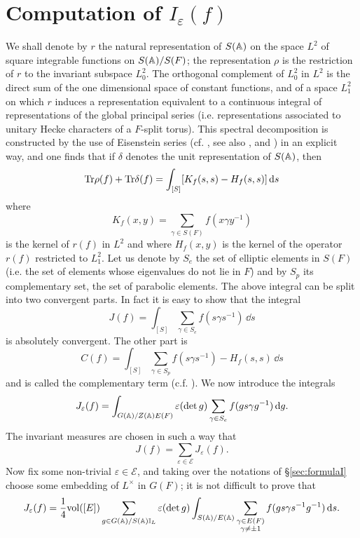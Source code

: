\section{Computation of $I_\varepsilon(f)$}
\label{sec:computation}

We shall denote by $r$ the natural representation of $S(\mathbb{A})$ on the space $L^2$ of square integrable functions on $S(\mathbb{A}) / S(F)$; the representation $\rho$ is the restriction of $r$ to the invariant subspace $L^2_0$.
The orthogonal complement of $L^2_0$ in $L^2$ is the direct sum of the one dimensional space of constant functions, and of a space $L^2_1$ on which $r$ induces a representation equivalent to a continuous integral of representations of the global principal series (i.e. representations associated to unitary Hecke characters of a $F$-split torus).
This spectral decomposition is constructed by the use of Eisenstein series (cf. \cite{godement1964analyse}, see also \cite{duflo1971formule}, \cite{gelfand1966} and \cite{jacquet1970automorphic}) in an explicit way, and one finds that if $\delta$ denotes the unit representation of $S(\mathbb{A})$, then
\[
    \mathrm{Tr} \rho(f) + \mathrm{Tr} \delta(f) = \int_{[S]} [K_f(s, s) - H_f(s, s)] \, \mathrm{d} s
\]
where
\[
K_f(x, y) = \sum_{\gamma \in S(F)} f(x \gamma y^{-1})
\]
is the kernel of $r(f)$ in $L^2$ and where $H_f(x, y)$ is the kernel of the operator $r(f)$ restricted to $L^2_1$.
Let us denote by $S_e$ the set of elliptic elements in $S(F)$ (i.e. the set of elements whose eigenvalues do not lie in $F$) and by $S_p$ its complementary set, the set of parabolic elements.
The above integral can be split into two convergent parts.
In fact it is easy to show that the integral
\[
J(f) = \int_{[S]}  \sum_{\gamma \in S_e} f(s \gamma s^{-1}) \, \dd s
\]
is absolutely convergent.
The other part is
\[
C(f) = \int_{[S]}  \sum_{\gamma \in S_p} f(s \gamma s^{-1}) - H_f(s, s)\, \dd s
\]
and is called the complementary term (c.f. \cite{duflo1971formule}).
We now introduce the integrals
\[
J_\varepsilon(f) = \int_{G(\mathbb{A}) / Z(\mathbb{A})E(F)} \varepsilon(\det g) \sum_{\gamma \in S_e} f(g s\gamma g^{-1}) \, \mathrm{d} g.
\]
The invariant measures are chosen in such a way that
\[
J(f) = \sum_{\varepsilon \in \mathscr{E}} J_\varepsilon(f).
\]
Now fix some non-trivial $\varepsilon \in \mathscr{E}$, and taking over the notations of \S \ref{sec:formulaI} choose some embedding of $L^\times$ in $G(F)$; it is not difficult to prove that
\[
J_\varepsilon(f) = \frac{1}{4} \mathrm{vol}([E]) \sum_{g \in G(\mathbb{A}) / S(\mathbb{A}) \mathbb{I}_L} \varepsilon(\det g) \int_{S(\mathbb{A}) / E(\mathbb{A})} \sum_{\substack{\gamma \in E(F) \\ \gamma \ne \pm 1}} f(g s \gamma s^{-1} g^{-1}) \, \mathrm{d} s.
\]
